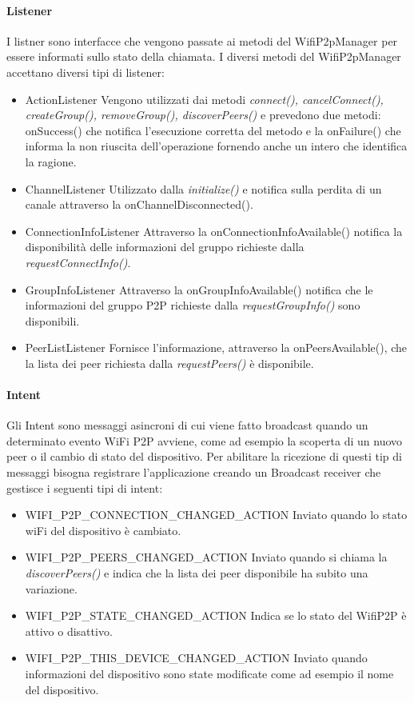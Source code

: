 \documentclass{llncs}
\begin{document}
\paragraph{Listener}
I listner sono interfacce che vengono passate ai metodi del WifiP2pManager per essere informati sullo stato della chiamata. I diversi metodi del WifiP2pManager accettano diversi tipi di listener:
\begin{itemize}
	\item{ActionListener} Vengono utilizzati dai metodi \textit{connect(), cancelConnect(), createGroup(), removeGroup(), discoverPeers()} e prevedono due metodi: onSuccess() che notifica l'esecuzione corretta del metodo e la onFailure() che informa la non riuscita dell'operazione fornendo anche un intero che identifica la ragione.
	\item{ChannelListener} Utilizzato dalla \textit{initialize()} e notifica sulla perdita di un canale attraverso la onChannelDisconnected().
	\item{ConnectionInfoListener} Attraverso la onConnectionInfoAvailable() notifica la disponibilità delle informazioni del gruppo richieste dalla \textit{requestConnectInfo()}.
	\item{GroupInfoListener} Attraverso la onGroupInfoAvailable() notifica che le informazioni del gruppo P2P richieste dalla \textit{requestGroupInfo()} sono disponibili.
	\item{PeerListListener} Fornisce l'informazione, attraverso la onPeersAvailable(), che la lista dei peer richiesta dalla \textit{requestPeers()} è disponibile.
\end{itemize}

\paragraph{Intent}
Gli Intent sono messaggi asincroni di cui viene fatto broadcast quando un determinato evento WiFi P2P avviene, come ad esempio la scoperta di un  nuovo peer o il cambio di stato del dispositivo. Per abilitare la ricezione di questi tip di messaggi bisogna registrare l'applicazione creando un Broadcast receiver che gestisce i seguenti tipi di intent:
\begin{itemize}
	\item{WIFI\_P2P\_CONNECTION\_CHANGED\_ACTION} Inviato quando lo stato wiFi del dispositivo è cambiato.
	\item{WIFI\_P2P\_PEERS\_CHANGED\_ACTION} Inviato quando si chiama la  \textit{discoverPeers()} e indica che la lista dei peer disponibile ha subito una variazione.
	\item{WIFI\_P2P\_STATE\_CHANGED\_ACTION} Indica se lo stato del WifiP2P è attivo o disattivo.
	\item{WIFI\_P2P\_THIS\_DEVICE\_CHANGED\_ACTION} Inviato quando informazioni del dispositivo sono state modificate come ad esempio il nome del dispositivo.
\end{itemize}
\end{document}
